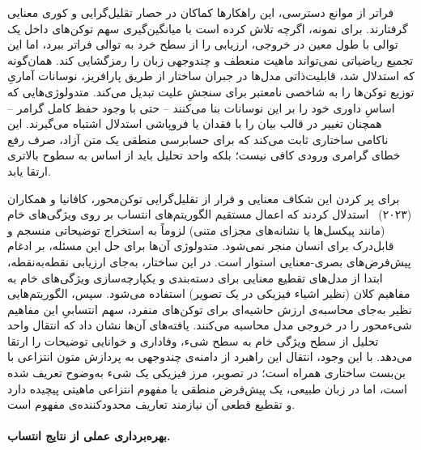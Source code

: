 فراتر از موانع دسترسی، این راهکارها کماکان در حصار تقلیل‌گرایی و کوری معنایی گرفتارند. برای نمونه، اگرچه  تلاش کرده است با میانگین‌گیری سهم توکن‌های داخل یک توالی با طول معین در خروجی، ارزیابی را از سطح خرد به توالی فراتر ببرد، اما این تجمیع ریاضیاتی نمی‌تواند ماهیت منعطف و چندوجهی زبان را رمزگشایی کند. همان‌گونه که استدلال شد، قابلیت‌ذاتی مدل‌ها در جبران ساختار از طریق پارافریز، نوسانات آماریِ توزیع توکن‌ها را به شاخصی نامعتبر برای سنجشِ علیت تبدیل می‌کند. متدولوژی‌هایی که اساسِ داوری خود را بر این نوسانات بنا می‌کنند – حتی با وجود حفظ کامل گرامر – همچنان تغییر در قالب بیان را با فقدان یا فروپاشی استدلال اشتباه می‌گیرند. این ناکامی ساختاری ثابت می‌کند که برای حسابرسی منطقی یک متن آزاد، صرف رفع خطای گرامری ورودی کافی نیست؛ بلکه واحد تحلیل باید از اساس به سطوح بالاتری ارتقا یابد.

برای پر کردن این شکاف معنایی و فرار از تقلیل‌گرایی توکن‌محور، کافانیا و همکاران (۲۰۲۳)~\cite{cafagna2023interpreting} استدلال کردند که اعمال مستقیم الگوریتم‌های انتساب بر روی ویژگی‌های خام (مانند پیکسل‌ها یا نشانه‌های مجزای متنی) لزوماً به استخراج توضیحاتی منسجم و قابل‌درک برای انسان منجر نمی‌شود. متدولوژی آن‌ها برای حل این مسئله، بر ادغام پیش‌فرض‌های بصری-معنایی استوار است. در این ساختار، به‌جای ارزیابی نقطه‌به‌نقطه، ابتدا از مدل‌های تقطیع معنایی برای دسته‌بندی و یکپارچه‌سازی ویژگی‌های خام به مفاهیم کلان (نظیر اشیاء فیزیکی در یک تصویر) استفاده می‌شود. سپس، الگوریتم‌هایی نظیر  به‌جای محاسبه‌ی ارزش حاشیه‌ای برای توکن‌های منفرد، سهم انتسابیِ این مفاهیم شیء‌محور را در خروجی مدل محاسبه می‌کنند. یافته‌های آن‌ها نشان داد که انتقال واحد تحلیل از سطح ویژگی خام به سطح شیء، وفاداری و خوانایی توضیحات را ارتقا می‌دهد. با این وجود، انتقال این راهبرد از دامنه‌ی چندوجهی به پردازش متون انتزاعی با بن‌بست ساختاری همراه است؛ در تصویر، مرز فیزیکی یک شیء به‌وضوح تعریف شده است، اما در زبان طبیعی، یک پیش‌فرض منطقی یا مفهوم انتزاعی ماهیتی پیچیده دارد و تقطیع قطعی آن نیازمند تعاریف محدودکننده‌ی مفهوم است.

\paragraph{بهره‌برداری عملی از نتایج انتساب.}

